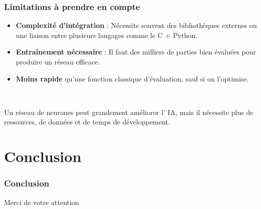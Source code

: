 \documentclass[9pt]{beamer}
\begin{document}
\begin{frame}
  \frametitle{Limitations à prendre en compte}
  \begin{itemize}
    \item \textbf{Complexité d’intégration} : Nécessite souvent des bibliothèques externes ou une liaison entre plusieurs langages comme le C + Python.
    \item \textbf{Entraînement nécessaire} : Il faut des milliers de parties bien évaluées pour produire un réseau efficace.
    \item \textbf{Moins rapide} qu’une fonction classique d'évaluation, sauf si on l'optimise.
  \end{itemize}

  ~

    Un réseau de neurones peut grandement améliorer l' IA, mais il nécessite plus de ressources, de données et de temps de développement.

\end{frame}

\section{Conclusion}
\begin{frame}
  \frametitle{Conclusion}
  Merci de votre attention
\end{frame}
\end{document}
